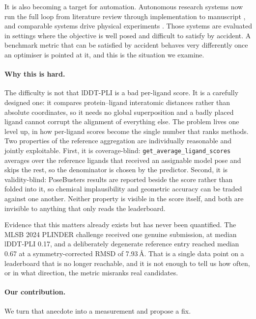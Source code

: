 \documentclass{article} %
\begin{document}
It is also becoming a target for automation. Autonomous research systems now run the
full loop from literature review through implementation to manuscript
\citep{tang-2025-researcher}, and comparable systems drive physical experiments
\citep{boiko-2023-autonomous}. Those systems are evaluated in settings where the objective is
well posed and difficult to satisfy by accident. A benchmark metric that can be
satisfied by accident behaves very differently once an optimiser is pointed at it, and
this is the situation we examine.

\paragraph{Why this is hard.} The difficulty is not that lDDT-PLI is a bad per-ligand
score. It is a carefully designed one: it compares protein--ligand interatomic distances
rather than absolute coordinates, so it needs no global superposition and a badly placed
ligand cannot corrupt the alignment of everything else. The problem lives one level up,
in how per-ligand scores become the single number that ranks methods. Two properties of
the reference aggregation are individually reasonable and jointly exploitable. First, it
is coverage-blind: \texttt{get\_average\_ligand\_scores} averages over the reference
ligands that received an assignable model pose and skips the rest, so the denominator is
chosen by the predictor. Second, it is validity-blind: PoseBusters
\citep{buttenschoen-2023-posebusters} results are reported beside the score rather than
folded into it, so chemical implausibility and geometric accuracy can be traded against
one another. Neither property is visible in the score itself, and both are invisible to
anything that only reads the leaderboard.

Evidence that this matters already exists but has never been quantified. The MLSB 2024
PLINDER challenge received one genuine submission, at median lDDT-PLI 0.17, and a
deliberately degenerate reference entry reached median 0.67 at a symmetry-corrected RMSD
of 7.93\,\AA{}. That is a single data point on a leaderboard that is no longer
reachable, and it is not enough to tell us how often, or in what direction, the metric
misranks real candidates.

\paragraph{Our contribution.} We turn that anecdote into a measurement and propose a fix.
\end{document}
